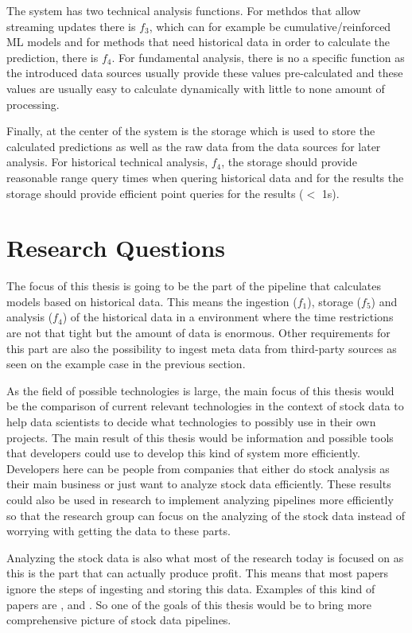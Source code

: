 The system has two technical analysis functions.
For methdos that allow streaming updates there is $f_3$, which can for example be cumulative/reinforced ML models and for methods that need historical data in order to calculate the prediction, there is $f_4$.
For fundamental analysis, there is no a specific function as the introduced data sources usually provide these values pre-calculated and these values are usually easy to calculate dynamically with little to none amount of processing.

Finally, at the center of the system is the storage which is used to store the calculated predictions as well as the raw data from the data sources for later analysis.
For historical technical analysis, $f_4$, the storage should provide reasonable range query times when quering historical data and for the results the storage should provide efficient point queries for the results ($<$ 1s).

\section{Research Questions}

The focus of this thesis is going to be the part of the pipeline that calculates models based on historical data.
This means the ingestion ($f_1$), storage ($f_5$) and analysis ($f_4$) of the historical data in a environment where the time restrictions are not that tight but the amount of data is enormous.
Other requirements for this part are also the possibility to ingest meta data from third-party sources as seen on the example case in the previous section.

As the field of possible technologies is large, the main focus of this thesis would be the comparison of current relevant technologies in the context of stock data to help data scientists to decide what technologies to possibly use in their own projects.
The main result of this thesis would be information and possible tools that developers could use to develop this kind of system more efficiently.
Developers here can be people from companies that either do stock analysis as their main business or just want to analyze stock data efficiently.
These results could also be used in research to implement analyzing pipelines more efficiently so that the research group can focus on the analyzing of the stock data instead of worrying with getting the data to these parts.

Analyzing the stock data is also what most of the research today is focused on as this is the part that can actually produce profit.
This means that most papers ignore the steps of ingesting and storing this data.
Examples of this kind of papers are \cite{wu}, \cite{aghakhani} and \cite{kao}.
So one of the goals of this thesis would be to bring more comprehensive picture of stock data pipelines. 

